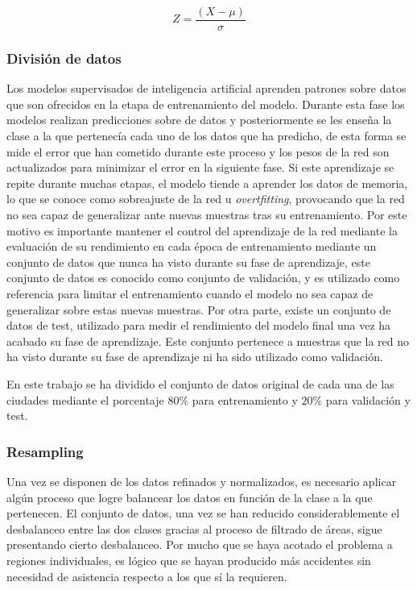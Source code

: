 \begin{equation}
	Z = \frac{(X - \mu)}{\sigma}
\end{equation}


\subsubsection{División de datos}


Los modelos supervisados de inteligencia artificial aprenden patrones sobre datos que son ofrecidos en la etapa de entrenamiento del modelo. Durante esta fase los modelos realizan predicciones sobre de datos y posteriormente se les enseña la clase a la que pertenecía cada uno de los datos que ha predicho, de esta forma se mide el error que han cometido durante este proceso y los pesos de la red son actualizados para minimizar el error en la siguiente fase. Si este aprendizaje se repite durante muchas etapas, el modelo tiende a aprender los datos de memoria, lo que se conoce como sobreajuste de la red u \textit{overtfitting}, provocando que la red no sea capaz de generalizar ante nuevas muestras tras su entrenamiento. Por este motivo es importante mantener el control del aprendizaje de la red mediante la evaluación de su rendimiento en cada época de entrenamiento mediante un conjunto de datos que nunca ha visto durante su fase de aprendizaje, este conjunto de datos es conocido como conjunto de validación, y es utilizado como referencia para limitar el entrenamiento cuando el modelo no sea capaz de generalizar sobre estas nuevas muestras. Por otra parte, existe un conjunto de datos de test, utilizado para medir el rendimiento del modelo final una vez ha acabado su fase de aprendizaje. Este conjunto pertenece a muestras que la red no ha visto durante su fase de aprendizaje ni ha sido utilizado como validación.

En este trabajo se ha dividido el conjunto de datos original de cada una de las ciudades mediante el porcentaje $80\%$ para entrenamiento y $20\%$ para validación y test.

\subsubsection{Resampling}

Una vez se disponen de los datos refinados y normalizados, es necesario aplicar algún proceso que logre balancear los datos en función de la clase a la que pertenecen. El conjunto de datos, una vez se han reducido considerablemente el desbalanceo entre las dos clases gracias al proceso de filtrado de áreas, sigue presentando cierto desbalanceo. Por mucho que se haya acotado el problema a regiones individuales, es lógico que se hayan producido más accidentes sin necesidad de asistencia respecto a los que sí la requieren.

